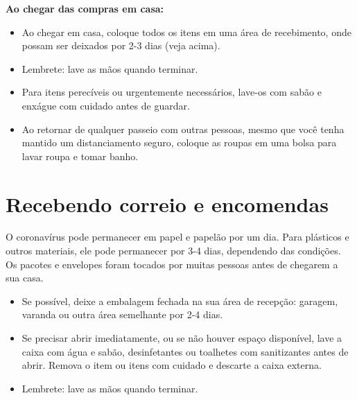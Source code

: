 \documentclass[onecolumn,journal]{IEEEtran}
\begin{document}
\begin{multicols}{2}
\vspace{2ex}

\textbf{Ao chegar das compras em casa:}

\vspace{2ex}

\begin{itemize}
    \item Ao chegar em casa, coloque todos os itens em uma área de recebimento, onde possam ser deixados por 2-3 dias (veja acima).
    \item Lembrete: lave as mãos quando terminar.
    \item Para itens perecíveis ou urgentemente necessários, lave-os com sabão e enxágue com cuidado antes de guardar.
    \item Ao retornar de qualquer passeio com outras pessoas, mesmo que você tenha mantido um distanciamento seguro, coloque as roupas em uma bolsa para lavar roupa e tomar banho.
\end{itemize}

\section*{Recebendo correio e encomendas}

O coronavírus pode permanecer em papel e papelão por um dia. Para plásticos e outros materiais, ele pode permanecer por 3-4 dias, dependendo das condições. Os pacotes e envelopes foram tocados por muitas pessoas antes de chegarem a sua casa.

\vspace{2ex}

\begin{itemize}
    \item Se possível, deixe a embalagem fechada na sua área de recepção: garagem, varanda ou outra área semelhante por 2-4 dias.
    \item Se precisar abrir imediatamente, ou se não houver espaço disponível, lave a caixa com água e sabão, desinfetantes ou toalhetes com sanitizantes antes de abrir. Remova o item ou itens com cuidado e descarte a caixa externa.
    \item Lembrete: lave as mãos quando terminar.
\end{itemize}


\end{multicols}

\vspace{2ex}







% 

\end{document}
